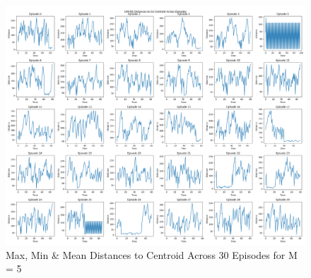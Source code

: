 \begin{figure}
    \centering
    \includegraphics[width=0.8\linewidth]{figures/test8_without_trajectory/5_layers_distances_to_centroid.png}
    \caption{Max, Min \& Mean Distances to Centroid Across 30 Episodes for M = 5}
    \label{fig:dist_to_centroid_5_layers_30_ep}
\end{figure}
\newpage
